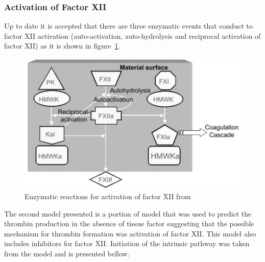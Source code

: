 \documentclass[%
 nofootinbib,
 amsmath,amssymb,
 aps,
 pra,
]{revtex4-1}
\begin{document}
\subsubsection{Activation of Factor XII}
Up to date it is accepted that there are three enzymatic events that conduct to factor XII activation (auto-activation, auto-hydrolysis  and reciprocal activation of factor XII) as it is shown in figure~\ref{fig:activationFXIIa}.\\
\begin{figure}[h]
\includegraphics[scale=0.4]{Figures/ActivationFXIIa.png}
\caption{\label{fig:activationFXIIa} Enzymatic reactions for activation of  factor XII from \citet{Chatterjee:2009a}}
\end{figure}
The second model presented is a portion of \citet{Chatterjee:2010} model that was used to predict the thrombin production in the absence of tissue factor suggesting that the possible mechanism for thrombin formation was activation of factor XII. This model also includes inhibitors for factor XII. Initiation of the intrinsic pathway was taken from the model and is presented bellow.\\
\end{document}
